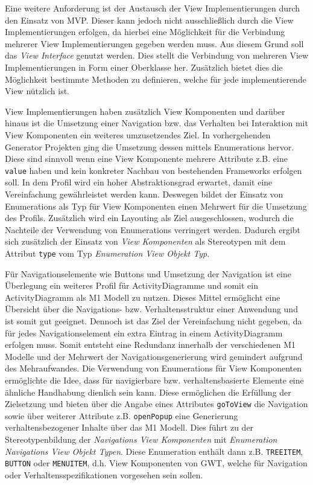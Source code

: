 Eine weitere Anforderung ist der Austausch der View Implementierungen durch den
Einsatz von MVP. Dieser kann jedoch nicht ausschließlich durch die View
Implementierungen erfolgen, da hierbei eine Möglichkeit für die
Verbindung mehrerer View Implementierungen gegeben werden muss. Aus diesem Grund
soll das \textit{View Interface} genutzt werden. Dies stellt die Verbindung von mehreren
View Implementierungen in Form einer Oberklasse her. Zusätzlich bietet dies die
Möglichkeit bestimmte Methoden zu definieren, welche für jede implementierende
View nützlich ist. 

View Implementierungen haben zusätzlich View Komponenten und darüber hinaus ist
die Umsetzung einer Navigation bzw. das Verhalten bei Interaktion mit
View Komponenten ein weiteres umzusetzendes Ziel. In vorhergehenden Generator
Projekten ging die Umsetzung dessen mittels Enumerations hervor. Diese sind
sinnvoll wenn eine View Komponente mehrere Attribute z.B. eine \texttt{value}
haben und kein konkreter Nachbau von bestehenden Frameworks erfolgen soll. In dem Profil
wird ein hoher Abstraktionsgrad erwartet, damit eine Vereinfachung gewährleistet
werden kann. Deswegen bildet der Einsatz von Enumerations als Typ für
View Komponenten einen Mehrwert für die Umsetzung des Profils. Zusätzlich wird ein Layouting als
Ziel ausgeschlossen, wodurch die Nachteile der Verwendung von Enumerations
verringert werden. Dadurch ergibt sich zusätzlich der Einsatz von \textit{View
Komponenten} als Stereotypen mit dem Attribut \texttt{type} vom Typ
\textit{Enumeration View Objekt Typ}.

Für Navigationselemente wie Buttons und Umsetzung der Navigation ist eine
Überlegung ein weiteres Profil für ActivityDiagramme und somit ein
ActivityDiagramm als M1 Modell zu nutzen. Dieses Mittel ermöglicht eine
Übersicht über die Navigations- bzw. Verhaltensstruktur einer Anwendung
und ist somit gut geeignet. Dennoch ist das Ziel der Vereinfachung nicht
gegeben, da für jedes Navigationselement ein extra Eintrag in einem
ActivityDiagramm erfolgen muss. Somit entsteht eine Redundanz innerhalb der
verschiedenen M1 Modelle und der Mehrwert der Navigationsgenerierung wird
gemindert aufgrund des Mehraufwandes. Die Verwendung von Enumerations für View
Komponenten ermöglichte die Idee, dass für navigierbare bzw. verhaltensbasierte
Elemente eine ähnliche Handhabung dienlich sein kann. Diese ermöglichen die Erfüllung der
Zielsetzung und bieten über die Angabe eines Attributes \texttt{goToView} die
Navigation sowie über weiterer Attribute z.B. \texttt{openPopup} eine
Generierung verhaltensbezogener Inhalte über das M1 Modell. Dies führt zu der
Stereotypenbildung der \textit{Navigations View Komponenten} mit
\textit{Enumeration Navigations View Objekt Typen}. Diese Enumeration enthält
dann z.B. \texttt{TREEITEM}, \texttt{BUTTON} oder \texttt{MENUITEM}, d.h. View
Komponenten von GWT, welche für Navigation oder Verhaltensspezifikationen vorgesehen sein sollen.

